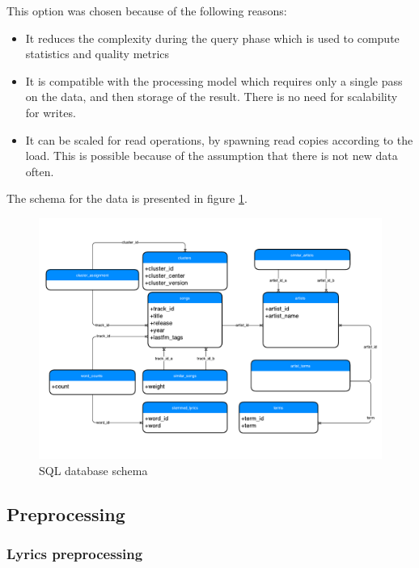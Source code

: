 \documentclass[10pt,a4paper, twocolumn]{article}
\begin{document}
    This option was chosen because of the following reasons:
 
    \begin{itemize}
      \item It reduces the complexity during the query phase which is used to
            compute statistics and quality metrics
      \item It is compatible with the processing model which requires only a
            single pass on the data, and then storage of the result. There
            is no need for scalability for writes.
      \item It can be scaled for read operations, by spawning read copies
            according to the load. This is possible because of the assumption
            that there is not new data often.
    \end{itemize}        
 
    The schema for the data is presented in figure \ref{fig:data_schema}.
 
    \begin{figure}
      \centering
      \includegraphics[scale=0.6]{img/database}
      \caption{SQL database schema}
      \label{fig:data_schema}
    \end{figure}        

    \subsection{Preprocessing}
    \subsubsection{Lyrics preprocessing}
    \label{sec:preprocessing}
\end{document}
